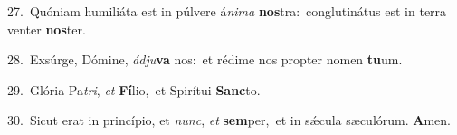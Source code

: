 {\numbfont\textcolor{\numbcolor}{27.}}~Quóniam humiliáta est in púlvere á\-\textit{ni}\-\textit{ma} \textbf{nos}\-tra:~\star conglutinátus est in terra venter \textbf{nos}\-ter.\par
{\numbfont\textcolor{\numbcolor}{28.}}~Exsúrge, Dómine, \textit{ád}\-\textit{ju}\textbf{va} nos:~\star et rédime nos propter nomen \textbf{tu}\-um.\par
{\numbfont\textcolor{\numbcolor}{29.}}~Glória Pa\-\textit{tri}\-, \textit{et} \textbf{Fí}\-lio,~\star et Spirítui \textbf{Sanc}\-to.\par
{\numbfont\textcolor{\numbcolor}{30.}}~Sicut erat in princípio, et \textit{nunc}\-, \textit{et} \textbf{sem}\-per,~\star et in sǽcula sæculórum. \textbf{A}\-men.\par

